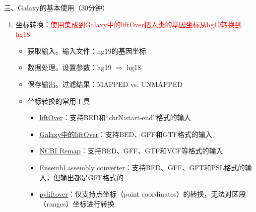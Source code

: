 \documentclass{TIJMUjiaoanLL}
\begin{document}
\vspace*{0.2cm}
\noindent
三、Galaxy的基本使用（30分钟）
\begin{enumerate}
  \item 坐标转换：\textcolor{red}{使用集成到Galaxy中的liftOver把人类的基因坐标从hg19转换到hg18}
    \begin{itemize}
      \item 获取输入。输入文件：hg19的基因坐标
      \item 数据处理。设置参数：hg19 $\Rightarrow$ hg18
      \item 保存输出。过滤结果：MAPPED vs. UNMAPPED
      \item 坐标转换的常用工具
        \begin{itemize}
          \item \href{http://genome.ucsc.edu/cgi-bin/hgLiftOver}{liftOver}：支持BED和“chrN:start-end”格式的输入
          \item \href{https://usegalaxy.org/}{Galaxy中的liftOver}：支持BED、GFF和GTF格式的输入
          \item \href{http://www.ncbi.nlm.nih.gov/genome/tools/remap}{NCBI Remap}：支持BED、GFF、GTF和VCF等格式的输入
          \item \href{http://asia.ensembl.org/Homo\_sapiens/UserData/SelectFeatures}{Ensembl assembly converter}：支持BED、GFF、GFT和PSL格式的输入，但输出都是GFF格式的
          \item \href{https://pypi.python.org/pypi/pyliftover}{pyliftover}：仅支持点坐标（point coordinates）的转换，无法对区段（ranges）坐标进行转换
        \end{itemize}
    \end{itemize}


\otherTail
\newpage
\otherHeader



\end{enumerate}
\end{document}
